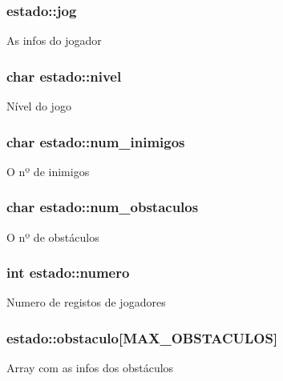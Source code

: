 \subsubsection[{\texorpdfstring{jog}{jog}}]{ estado\+::jog}\hypertarget{structestado_a2fad6d9b40818f08c6d0d09c34916be1}{}\label{structestado_a2fad6d9b40818f08c6d0d09c34916be1}
As infos do jogador 
\subsubsection[{\texorpdfstring{nivel}{nivel}}]{\setlength{\rightskip}{0pt plus 5cm}char estado\+::nivel}\hypertarget{structestado_a620f2f81ebfe4cba1d6e44b09a1762f7}{}\label{structestado_a620f2f81ebfe4cba1d6e44b09a1762f7}
Nível do jogo 
\subsubsection[{\texorpdfstring{num\+\_\+inimigos}{num_inimigos}}]{\setlength{\rightskip}{0pt plus 5cm}char estado\+::num\+\_\+inimigos}\hypertarget{structestado_a6fbc4a80c4f371036f264ecfe27e5f9e}{}\label{structestado_a6fbc4a80c4f371036f264ecfe27e5f9e}
O nº de inimigos 
\subsubsection[{\texorpdfstring{num\+\_\+obstaculos}{num_obstaculos}}]{\setlength{\rightskip}{0pt plus 5cm}char estado\+::num\+\_\+obstaculos}\hypertarget{structestado_ac1a8a541e2301189833c6f713c416063}{}\label{structestado_ac1a8a541e2301189833c6f713c416063}
O nº de obstáculos 
\subsubsection[{\texorpdfstring{numero}{numero}}]{\setlength{\rightskip}{0pt plus 5cm}int estado\+::numero}\hypertarget{structestado_a89701bb4e389f671e0426814ac00347d}{}\label{structestado_a89701bb4e389f671e0426814ac00347d}
Numero de registos de jogadores 
\subsubsection[{\texorpdfstring{obstaculo}{obstaculo}}]{ estado\+::obstaculo\mbox{[}{\bf M\+A\+X\+\_\+\+O\+B\+S\+T\+A\+C\+U\+L\+OS}\mbox{]}}\hypertarget{structestado_aca60907ddbf62ab205cdb578708b74e1}{}\label{structestado_aca60907ddbf62ab205cdb578708b74e1}
Array com as infos dos obstáculos 
